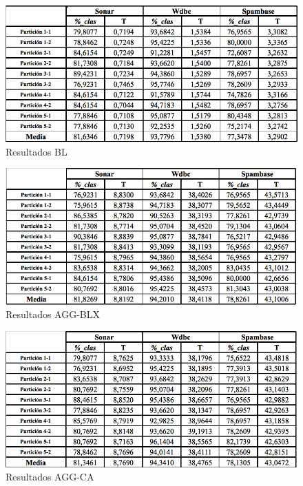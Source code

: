 \begin{figure}[H]
	\centering
	\caption{Resultados BL} \label{fig: Resultados BL}
	\includegraphics[scale=0.55]{BL.png}  
	
\end{figure}

\begin{figure}[H]
	\centering
	\caption{Resultados AGG-BLX} \label{fig: Resultados AGG-BLX}
	\includegraphics[scale=0.55]{AGG-BLX.png}  
	
\end{figure}

\begin{figure}[H]
	\centering
	\caption{Resultados AGG-CA} \label{fig: Resultados AGG-CA}
	\includegraphics[scale=0.55]{AGG-CA.png}  
	
\end{figure}

